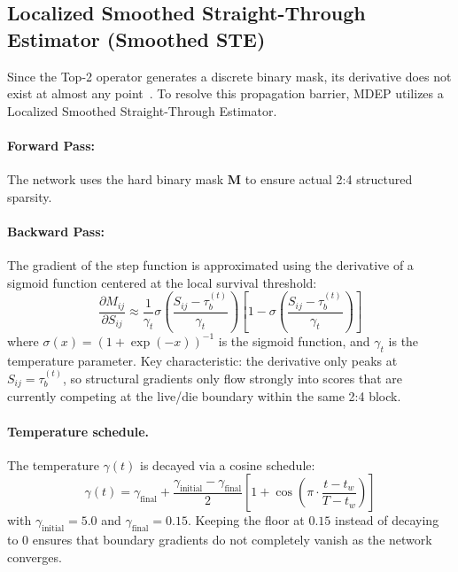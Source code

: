 \documentclass[11pt, a4paper]{article}
\begin{document}
\subsection{Localized Smoothed Straight-Through Estimator (Smoothed STE)}\label{subsec:ste}

Since the Top-2 operator generates a discrete binary mask, its derivative does not exist at almost any point~\cite{bengio2013estimating}. To resolve this propagation barrier, MDEP utilizes a Localized Smoothed Straight-Through Estimator.

\paragraph{Forward Pass:} The network uses the hard binary mask $\bm{M}$ to ensure actual 2:4 structured sparsity.

\paragraph{Backward Pass:} The gradient of the step function is approximated using the derivative of a sigmoid function centered at the local survival threshold:
\begin{equation}\label{eq:ste_grad}
    \frac{\partial M_{ij}}{\partial S_{ij}} \approx \frac{1}{\gamma_t} \sigma\!\left(\frac{S_{ij} - \tau_b^{(t)}}{\gamma_t}\right) \left[1 - \sigma\!\left(\frac{S_{ij} - \tau_b^{(t)}}{\gamma_t}\right)\right]
\end{equation}
where $\sigma(x) = (1 + \exp(-x))^{-1}$ is the sigmoid function, and $\gamma_t$ is the temperature parameter. Key characteristic: the derivative only peaks at $S_{ij} = \tau_b^{(t)}$, so structural gradients only flow strongly into scores that are currently competing at the live/die boundary within the same 2:4 block.

\paragraph{Temperature schedule.}
The temperature $\gamma(t)$ is decayed via a cosine schedule:
\begin{equation}\label{eq:gamma_schedule}
    \gamma(t) = \gamma_{\text{final}} + \frac{\gamma_{\text{initial}} - \gamma_{\text{final}}}{2}\left[1 + \cos\!\left(\pi \cdot \frac{t - t_w}{T - t_w}\right)\right]
\end{equation}
with $\gamma_{\text{initial}} = 5.0$ and $\gamma_{\text{final}} = 0.15$. Keeping the floor at $0.15$ instead of decaying to $0$ ensures that boundary gradients do not completely vanish as the network converges.
\end{document}
